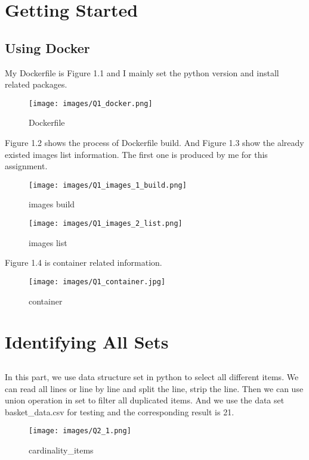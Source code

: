 \documentclass[paper=a4, fontsize=11pt]{scrartcl} %
\begin{document}
\maketitle %

\section{Getting Started}
\subsection{Using Docker}
My Dockerfile is Figure 1.1 and I mainly set the python version and install related packages.
\begin{figure}[htbp]
    \centering
    \texttt{[image: images/Q1\_docker.png]}
    \caption{Dockerfile}
    \label{fig:data-files}
    \end{figure}
Figure 1.2 shows the process of Dockerfile build. And Figure 1.3 show the already existed images list information. The first one is produced by me for this assignment.
\begin{figure}[htbp]
    \centering
    \texttt{[image: images/Q1\_images\_1\_build.png]}
    \caption{images build}
    \label{fig:data-files}
    \end{figure}
\begin{figure}[htbp]
    \centering
    \texttt{[image: images/Q1\_images\_2\_list.png]}
    \caption{images list}
    \label{fig:data-files}
    \end{figure}
Figure 1.4 is container related information.
\begin{figure}[htbp]
    \centering
    \texttt{[image: images/Q1\_container.jpg]}
    \caption{container}
    \label{fig:data-files}
    \end{figure}

\section{Identifying All Sets}
\subsection{}
 In this part, we use data structure set in python to select all different items. We can read all lines or line by line and split the line, strip the line. Then we can use union operation in set to filter all duplicated items. And we use the data set basket\_data.csv for testing and the corresponding result is 21.
    \begin{figure}[htbp]
    \centering
    \texttt{[image: images/Q2\_1.png]}
    \caption{cardinality\_items}
    \label{fig:data-files}
    \end{figure}
    
\end{document}
